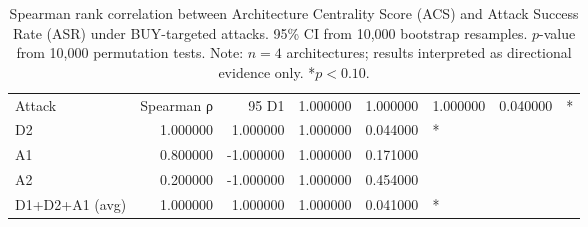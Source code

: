 \begin{table}
\caption{Spearman rank correlation between Architecture Centrality Score (ACS) and Attack Success Rate (ASR) under BUY-targeted attacks. 95\% CI from 10,000 bootstrap resamples. $p$-value from 10,000 permutation tests. Note: $n=4$ architectures; results interpreted as directional evidence only. *$p < 0.10$.}
\label{tab:stats}
\begin{tabular}{lrrrrl}
\toprule
Attack & Spearman ρ & 95%
\midrule
D1 & 1.000000 & 1.000000 & 1.000000 & 0.040000 & * \\
D2 & 1.000000 & 1.000000 & 1.000000 & 0.044000 & * \\
A1 & 0.800000 & -1.000000 & 1.000000 & 0.171000 &  \\
A2 & 0.200000 & -1.000000 & 1.000000 & 0.454000 &  \\
D1+D2+A1 (avg) & 1.000000 & 1.000000 & 1.000000 & 0.041000 & * \\
\bottomrule
\end{tabular}
\end{table}
